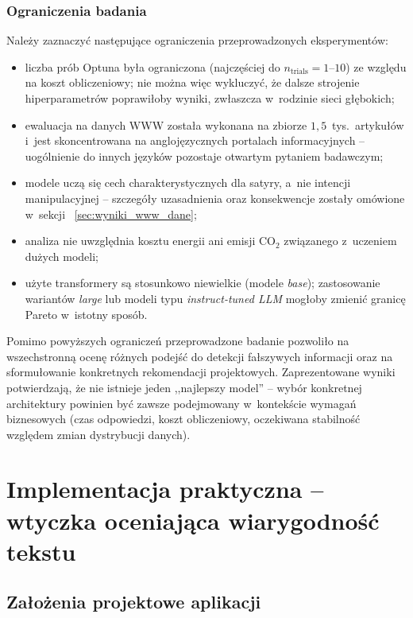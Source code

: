 \documentclass[oneside,polski,logo]{amuthesis}
\begin{document}
\subsection{Ograniczenia badania}
\label{sec:podsum_ograniczenia}

Należy zaznaczyć następujące ograniczenia przeprowadzonych
eksperymentów:

\begin{itemize}
  \item liczba prób Optuna była ograniczona (najczęściej do
        $n_\text{trials} = 1$--$10$) ze względu na koszt
        obliczeniowy; nie można więc wykluczyć, że dalsze strojenie
        hiperparametrów poprawiłoby wyniki, zwłaszcza w~rodzinie
        sieci głębokich;
  \item ewaluacja na danych WWW została wykonana na zbiorze
        \(1{,}5\)~tys.\ artykułów i~jest skoncentrowana na
        anglojęzycznych portalach informacyjnych -- uogólnienie do
        innych języków pozostaje otwartym pytaniem badawczym;
  \item modele uczą się cech charakterystycznych dla satyry, a~nie
        intencji manipulacyjnej -- szczegóły uzasadnienia oraz
        konsekwencje zostały omówione w~sekcji~%
        \ref{sec:wyniki_www_dane};
  \item analiza nie uwzględnia kosztu energii ani emisji CO$_2$
        związanego z~uczeniem dużych modeli;
  \item użyte transformery są stosunkowo niewielkie (modele
        \textit{base}); zastosowanie wariantów \textit{large} lub
        modeli typu \textit{instruct-tuned LLM} mogłoby zmienić
        granicę Pareto w~istotny sposób.
\end{itemize}

Pomimo powyższych ograniczeń przeprowadzone badanie pozwoliło na
wszechstronną ocenę różnych podejść do detekcji fałszywych
informacji oraz na sformułowanie konkretnych rekomendacji
projektowych. Zaprezentowane wyniki potwierdzają, że nie istnieje
jeden ,,najlepszy model'' -- wybór konkretnej architektury powinien
być zawsze podejmowany w~kontekście wymagań biznesowych
(czas odpowiedzi, koszt obliczeniowy, oczekiwana stabilność
względem zmian dystrybucji danych).

\chapter{Implementacja praktyczna -- wtyczka oceniająca wiarygodność tekstu}

\section{Założenia projektowe aplikacji}
\label{sec:impl_zalozenia}
\end{document}
